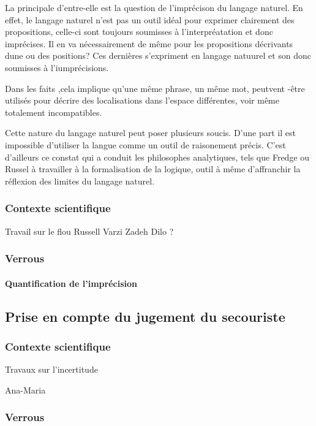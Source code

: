 La principale d'entre-elle est la question de l'imprécison du langage
naturel. En effet, le langage naturel n'est pas un outil idéal pour
exprimer clairement des propositions, celle-ci sont toujours
soumisses à l'interpréatation et donc imprécises. Il en va
nécessairement de même pour les propositions décrivants dune ou des
positions? Ces dernières s'expriment en langage natuurel et son donc
soumisses à l'iumprécisions.

Dans les faits ,cela implique qu'une même phrase, un même mot,
peutvent -être utilisés pour décrire des localisations dans l'espace
différentes, voir même totalement incompatibles.

Cette nature du langage naturel peut poser plusieurs soucis. D'une
part il est impossible d'utiliser la langue comme un outil de
raisonement précis. C'est d'ailleurs ce constat qui a conduit les
philosophes analytiques, tels que Fredge ou Russel à travailler à la
formalisation de la logique, outil à même d'affranchir la réflexion
des limites du langage naturel.



\subsubsection{Contexte scientifique}

Travail sur le flou
Russell
Varzi
Zadeh
Dilo ?


\subsubsection{Verrous}

\paragraph{Quantification de l'imprécision}

\subsection{Prise en compte du jugement du secouriste}
\label{subsec:2-1-3}

\subsubsection{Contexte scientifique}

Travaux sur l'incertitude

Ana-Maria

\subsubsection{Verrous}

